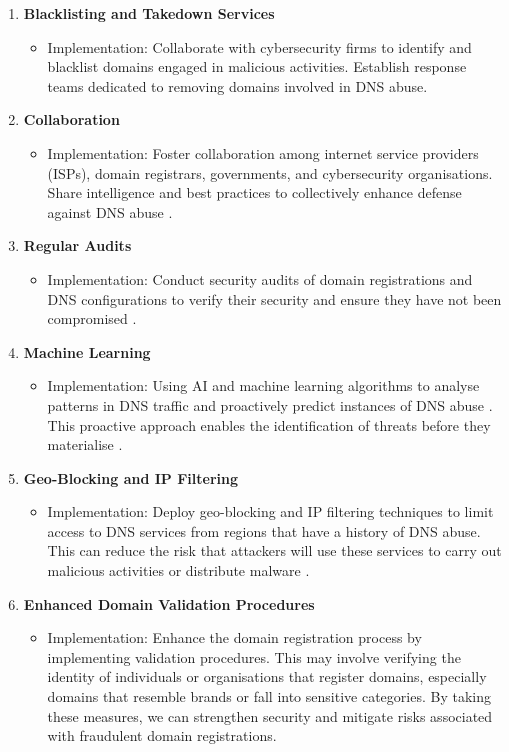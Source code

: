 \begin{enumerate}
    \item \textbf{Blacklisting and Takedown Services}
    \begin{itemize}
        \item Implementation: Collaborate with cybersecurity firms to identify and blacklist domains engaged in malicious activities. Establish response teams dedicated to removing domains involved in DNS abuse.
    \end{itemize}
    \item \textbf{Collaboration}
    \begin{itemize}
        \item Implementation: Foster collaboration among internet service providers (ISPs), domain registrars, governments, and cybersecurity organisations. Share intelligence and best practices to collectively enhance defense against DNS abuse \cite{skopik2017collaborative}.
    \end{itemize}
    \item \textbf{Regular Audits}
    \begin{itemize}
        \item Implementation: Conduct security audits of domain registrations and DNS configurations to verify their security and ensure they have not been compromised \cite{coronado2014auditing}.
    \end{itemize}
    \item \textbf{Machine Learning}
    \begin{itemize}
        \item Implementation: Using AI and machine learning algorithms to analyse patterns in DNS traffic and proactively predict instances of DNS abuse \cite{icannndnssec}. This proactive approach enables the identification of threats before they materialise \cite{tsukerman2019machine}.
    \end{itemize}
    \item \textbf{Geo-Blocking and IP Filtering}
    \begin{itemize}
        \item Implementation: Deploy geo-blocking and IP filtering techniques to limit access to DNS services from regions that have a history of DNS abuse. This can reduce the risk that attackers will use these services to carry out malicious activities or distribute malware \cite{meeseedited}.
    \end{itemize}
    \item \textbf{Enhanced Domain Validation Procedures}
    \begin{itemize}
        \item Implementation: Enhance the domain registration process by implementing validation procedures. This may involve verifying the identity of individuals or organisations that register domains, especially domains that resemble brands or fall into sensitive categories. By taking these measures, we can strengthen security and mitigate risks associated with fraudulent domain registrations.
    \end{itemize}
\end{enumerate}

